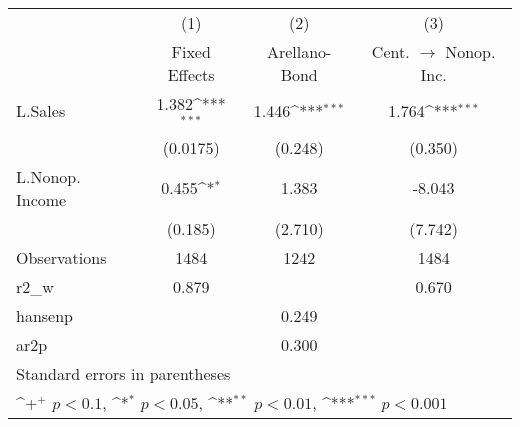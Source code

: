 {
\def\sym#1{\ifmmode^{#1}\else\(^{#1}\)\fi}
\begin{tabular}{l*{3}{c}}
\hline\hline
                    &\multicolumn{1}{c}{(1)}&\multicolumn{1}{c}{(2)}&\multicolumn{1}{c}{(3)}\\
                    &\multicolumn{1}{c}{Fixed Effects}&\multicolumn{1}{c}{Arellano-Bond}&\multicolumn{1}{c}{Cent. $\rightarrow$ Nonop. Inc.}\\
\hline
L.Sales             &       1.382\sym{***}&       1.446\sym{***}&       1.764\sym{***}\\
                    &    (0.0175)         &     (0.248)         &     (0.350)         \\
L.Nonop. Income     &       0.455\sym{*}  &       1.383         &      -8.043         \\
                    &     (0.185)         &     (2.710)         &     (7.742)         \\
\hline
Observations        &        1484         &        1242         &        1484         \\
r2\_w                &       0.879         &                     &       0.670         \\
hansenp             &                     &       0.249         &                     \\
ar2p                &                     &       0.300         &                     \\
\hline\hline
\multicolumn{4}{l}{\footnotesize Standard errors in parentheses}\\
\multicolumn{4}{l}{\footnotesize \sym{+} \(p<0.1\), \sym{*} \(p<0.05\), \sym{**} \(p<0.01\), \sym{***} \(p<0.001\)}\\
\end{tabular}
}
